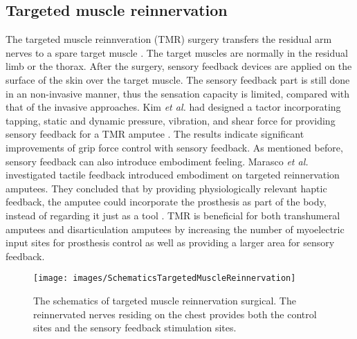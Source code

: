 \subsection{Targeted muscle reinnervation}
The targeted muscle reinnveration (TMR) surgery transfers the residual arm nerves to a spare target muscle \cite{kuiken2013targeted}. The target muscles are normally in the residual limb or the thorax.  
After the surgery, sensory feedback devices are applied on the surface of the skin over the target muscle. The sensory feedback part is still done in an non-invasive manner, thus the sensation capacity is limited, compared with that of the invasive approaches.
Kim \textit{et al.} had designed a tactor incorporating tapping, static and dynamic pressure, vibration, and shear force for providing sensory feedback for a TMR amputee \cite{kim2012haptic}. The results indicate significant improvements of grip force control with sensory feedback. As mentioned before, sensory feedback can also introduce embodiment feeling. Marasco \textit{et al.} investigated tactile feedback introduced embodiment on targeted reinnervation amputees. They concluded that by providing physiologically relevant haptic feedback, the amputee could incorporate the prosthesis as part of the body, instead of regarding it just as a tool \cite{marasco2011robotic}. TMR is beneficial for both transhumeral amputees and disarticulation amputees by increasing the number of myoelectric input sites for prosthesis control \cite{miller2008improved, kuiken2004use} as well as providing a larger area for sensory feedback. 


 \begin{figure}[htb]
    \centering
       \texttt{[image: images/SchematicsTargetedMuscleReinnervation]}
        \caption{The schematics of targeted muscle reinnervation surgical. The reinnervated nerves residing on the chest provides both the control sites and the sensory feedback stimulation sites.}
        \label{fig:graphical_representation_single_modalities}
\end{figure}


